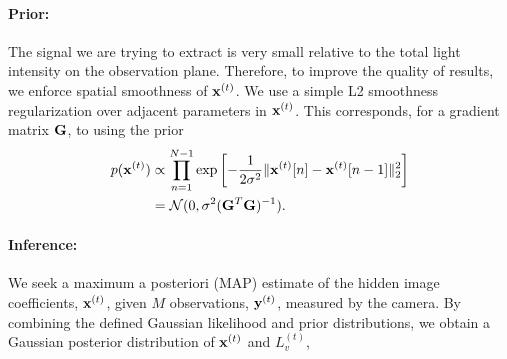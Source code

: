 \vspace{-.1in}
\paragraph{Prior: }
The signal we are trying to extract is very small relative to the total light intensity on the observation plane.
Therefore, to improve the quality of results, we enforce spatial
smoothness of $\mathbf{x}^{(t)}$. 
We use a simple L2 smoothness regularization 
over adjacent parameters in $\mathbf{x}^{(t)}$. This corresponds, for a gradient matrix $\mathbf{G}$, to using the prior
\begin{align}
  \notag   p(\mathbf{x}^{(t)}) &\propto \prod_{n=1}^{N-1} \exp \left[ -\frac{1}{2\sigma^2}  \Vert  \mathbf{x}^{(t)}[n] - \mathbf{x}^{(t)}[n-1] \Vert_2 ^2 \right] \\
           &= \mathcal{N}(0, \sigma^{2} (\mathbf{G}^T \mathbf{G})^{-1} ).
\end{align}


\vspace{-.1in}
\paragraph{Inference: }

We seek a maximum a posteriori (MAP) estimate of the hidden image coefficients, $\mathbf{x}^{(t)}$, given $M$ observations, $\mathbf{y}^{(t)}$, measured by the camera. By combining the defined Gaussian likelihood and prior distributions, we obtain a Gaussian posterior distribution of $\mathbf{x}^{(t)}$ and $L_v^{(t)}$, 

